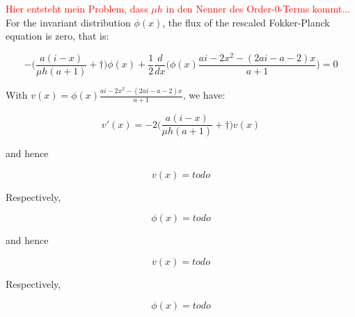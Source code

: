 \textcolor{red}{Hier entsteht mein Problem, dass $\mu h$ in den Nenner des Order-0-Terms kommt...}\newline
For the invariant distribution $\phi(x)$, the flux of the rescaled Fokker-Planck equation is zero, that is:

\begin{equation*}
-\Big(\frac{a(i-x)}{\mu h(a+1)} + \dagger\Big)\phi(x) + \frac{1}{2} \frac{d}{dx}\Big(\phi(x)\frac{ai - 2x^2 - (2ai - a -2)x}{a+1}\Big)= 0
\end{equation*}

With $v(x) = \phi(x)\frac{ai - 2x^2 - (2ai - a -2)x}{a+1}$, we have:

\begin{equation*}
v'(x) = -2\Big(\frac{a(i-x)}{\mu h(a+1)} + \dagger\Big)v(x)
\end{equation*}

and hence

\begin{equation*}
v(x) = todo
\end{equation*}

Respectively,

\begin{equation*}
\phi(x) = todo
\end{equation*}


and hence

\begin{equation*}
	v(x) = todo
\end{equation*}

Respectively,

\begin{equation*}
	\phi(x) = todo
\end{equation*}
